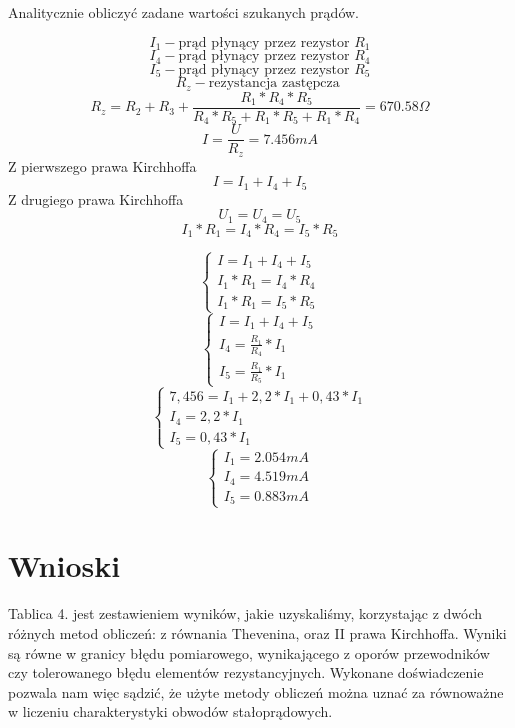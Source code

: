 \documentclass[polish,a4paper]{article}
\begin{document}
\subsection{}
Analitycznie obliczyć zadane wartości szukanych prądów.

$$I_{1} - \textrm{prąd płynący przez rezystor }R_{1}$$ 
$$I_{4} - \textrm{prąd płynący przez rezystor }R_{4}$$ 
$$I_{5} - \textrm{prąd płynący przez rezystor }R_{5}$$ 
$$R_{z} - \textrm{rezystancja zastępcza }$$ 
\newline
$$R_{z}=R_{2}+R_{3}+\frac{R_{1}*R_{4}*R_{5}}{R_{4}*R_{5}+R_{1}*R_{5}+R_{1}*R_{4}}=670.58\Omega$$
$$I=\frac{U}{R_{z}}=7.456mA$$
Z pierwszego prawa Kirchhoffa 
$$I=I_{1}+I_{4}+I_{5}$$
Z drugiego prawa Kirchhoffa 
$$U_{1}=U_{4}=U_{5}$$
$$I_{1}*R_{1}=I_{4}*R_{4}=I_{5}*R_{5}$$
\newline

$$
\left\{ \begin{array}{l}
I=I_{1}+I_{4}+I_{5}\\
I_{1}*R_{1}=I_{4}*R_{4}\\
I_{1}*R_{1}=I_{5}*R_{5}
\end{array} \right.
$$\newline
$$
\left\{ \begin{array}{l}
I=I_{1}+I_{4}+I_{5}\\
I_{4}=\frac{R_{1}}{R_{4}}*I_{1}\\
I_{5}=\frac{R_{1}}{R_{5}}*I_{1}
\end{array} \right.
$$\newline
$$
\left\{ \begin{array}{l}
7,456=I_{1}+2,2*I_{1}+0,43*I_{1}\\
I_{4}=2,2*I_{1}\\
I_{5}=0,43*I_{1}
\end{array} \right.
$$\newline
$$
\left\{ \begin{array}{l}
I_{1}=2.054mA\\
I_{4}=4.519mA\\
I_{5}=0.883mA
\end{array} \right.
$$

\section{Wnioski}
Tablica 4. jest zestawieniem wyników, jakie uzyskaliśmy, korzystając z dwóch różnych metod obliczeń: z równania Thevenina, oraz II prawa Kirchhoffa. Wyniki są równe w granicy błędu pomiarowego, wynikającego z oporów przewodników czy tolerowanego błędu elementów rezystancyjnych. Wykonane doświadczenie pozwala nam więc sądzić, że użyte metody obliczeń można uznać za równoważne w liczeniu charakterystyki obwodów stałoprądowych.
\end{document}
